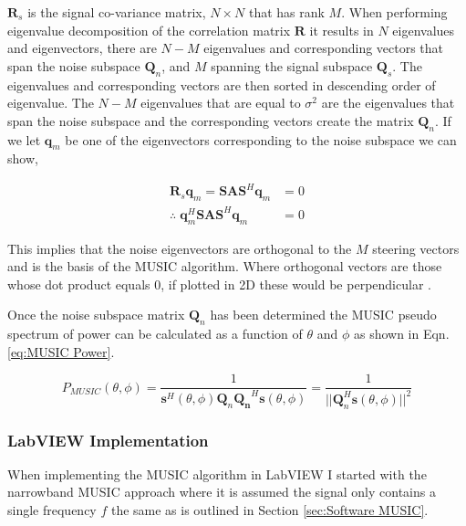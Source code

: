 \documentclass{UoNMCHA}
\numberwithin{equation}{section}
\begin{document}
    $\mathbf{R}_s$ is the signal co-variance matrix, $N \times N$ that has rank $M$. When performing eigenvalue decomposition of the correlation matrix $\mathbf{R}$ it results in $N$ eigenvalues and eigenvectors, there are $N - M$ eigenvalues and corresponding vectors that span the noise subspace $\mathbf{Q}_n$, and $M$ spanning the signal subspace $\mathbf{Q}_s$.
    The eigenvalues and corresponding vectors are then sorted in descending order of eigenvalue. The $N-M$ eigenvalues that are equal to $\sigma^2$ are the eigenvalues that span the noise subspace and the corresponding vectors create the matrix $\mathbf{Q}_n$. If we let $\mathbf{q}_m$ be one of the eigenvectors corresponding to the noise subspace we can show,
    
    \begin{equation}
    \begin{split}
        \mathbf{R}_s\mathbf{q}_m = \mathbf{SAS}^H\mathbf{q}_m & = 0\\
        \therefore \; \mathbf{q}_m^H\mathbf{SAS}^H\mathbf{q}_m & = 0
    \end{split}
    \end{equation}

    This implies that the noise eigenvectors are orthogonal to the $M$ steering vectors and is the basis of the MUSIC algorithm. Where orthogonal vectors are those whose dot product equals $0$, if plotted in 2D these would be perpendicular \citep{Wei}.
    
    Once the noise subspace matrix $\mathbf{Q}_n$ has been determined the MUSIC pseudo spectrum of power can be calculated as a function of $\theta$ and $\phi$ as shown in Eqn. \ref{eq:MUSIC Power}.
    
    \begin{equation}
        P_{MUSIC}(\theta,\phi) = \frac{1}{\mathbf{s}^H(\theta,\phi)\mathbf{Q}_n\mathbf{Q_n}^H\mathbf{s}(\theta,\phi)} = \frac{1}{||\mathbf{Q}_n^H\mathbf{s}(\theta,\phi)||^2}
        \label{eq:MUSIC Power}
    \end{equation}
    
\subsubsection{LabVIEW Implementation} \label{sec:MUSIC LabVIEW}
    When implementing the MUSIC algorithm in LabVIEW I started with the narrowband MUSIC approach where it is assumed the signal only contains a single frequency $f$ the same as is outlined in Section \ref{sec:Software MUSIC}.
    
\end{document}
